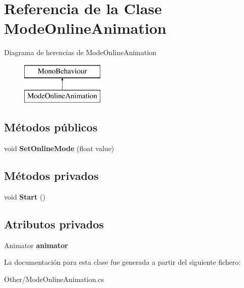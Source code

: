 \hypertarget{class_mode_online_animation}{}\section{Referencia de la Clase Mode\+Online\+Animation}
\label{class_mode_online_animation}
Diagrama de herencias de Mode\+Online\+Animation\begin{figure}[H]
\begin{center}
\leavevmode
\includegraphics[height=2.000000cm]{class_mode_online_animation}
\end{center}
\end{figure}
\subsection*{Métodos públicos}
\begin{DoxyCompactItemize}
\item 
\mbox{\label{class_mode_online_animation_adfb83f8ce5c4c077045b68f876b5334e}} 
void {\bfseries Set\+Online\+Mode} (float value)
\end{DoxyCompactItemize}
\subsection*{Métodos privados}
\begin{DoxyCompactItemize}
\item 
\mbox{\label{class_mode_online_animation_a1ee76089af380bf277bbda2188f004ce}} 
void {\bfseries Start} ()
\end{DoxyCompactItemize}
\subsection*{Atributos privados}
\begin{DoxyCompactItemize}
\item 
\mbox{\label{class_mode_online_animation_a5c2e34488f91eb247f99ce507e8e249c}} 
Animator {\bfseries animator}
\end{DoxyCompactItemize}


La documentación para esta clase fue generada a partir del siguiente fichero\+:\begin{DoxyCompactItemize}
\item 
Other/Mode\+Online\+Animation.\+cs\end{DoxyCompactItemize}
